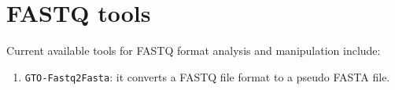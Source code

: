 \chapter{FASTQ tools}
\label{fastq}

Current available tools for FASTQ format analysis and manipulation include:
\begin{enumerate}

\item \texttt{GTO-Fastq2Fasta}: it converts a FASTQ file format to a pseudo FASTA file.

\end{enumerate}


